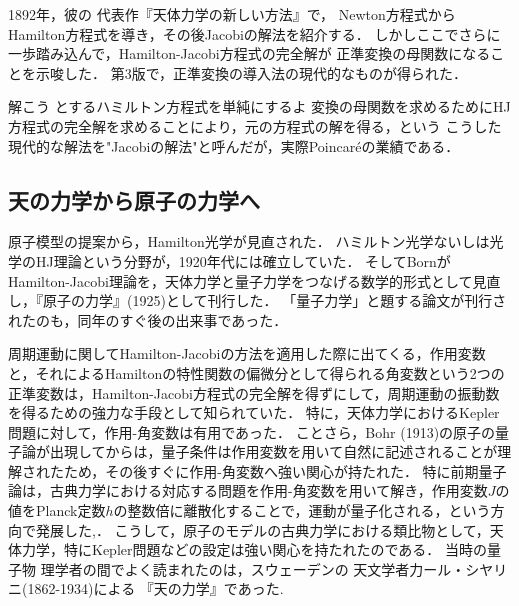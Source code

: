 \documentclass[uplatex,dvipdfmx]{jsreport}
\begin{document}
\begin{history}[Poincaréの本質的貢献]
    1892年，彼の
    代表作『天体力学の新しい方法』で，
    Newton方程式からHamilton方程式を導き，その後Jacobiの解法を紹介する．
    しかしここでさらに一歩踏み込んで，Hamilton-Jacobi方程式の完全解が
    正準変換の母関数になることを示唆した．
    第3版で，正準変換の導入法の現代的なものが得られた．

    解こう
とするハミルトン方程式を単純にするよ
変換の母関数を求めるためにHJ方程式の完全解を求めることにより，元の方程式の解を得る，という
    こうした現代的な解法を"Jacobiの解法"と呼んだが，実際Poincaréの業績である．
\end{history}

\subsection{天の力学から原子の力学へ}

\begin{tcolorbox}[colframe=ForestGreen, colback=ForestGreen!10!white,breakable,colbacktitle=ForestGreen!40!white,coltitle=black,fonttitle=\bfseries\sffamily,
title=]
    原子模型の提案から，Hamilton光学が見直された．
    ハミルトン光学ないしは光学のHJ理論という分野が，1920年代には確立していた．
    そしてBornがHamilton-Jacobi理論を，天体力学と量子力学をつなげる数学的形式として見直し，『原子の力学』(1925)として刊行した．
    「量子力学」と題する論文が刊行されたのも，同年のすぐ後の出来事であった．
\end{tcolorbox}

\begin{history}[『天の力学』]
    周期運動に関してHamilton-Jacobiの方法を適用した際に出てくる，作用変数と，それによるHamiltonの特性関数の偏微分として得られる角変数という2つの正準変数は，Hamilton-Jacobi方程式の完全解を得ずにして，周期運動の振動数を得るための強力な手段として知られていた．
    特に，天体力学におけるKepler問題に対して，作用-角変数は有用であった．
    ことさら，Bohr (1913)の原子の量子論が出現してからは，量子条件は作用変数を用いて自然に記述されることが理解されたため，その後すぐに作用-角変数へ強い関心が持たれた．
    特に前期量子論は，古典力学における対応する問題を作用-角変数を用いて解き，作用変数$J$の値をPlanck定数$h$の整数倍に離散化することで，運動が量子化される，という方向で発展した\cite{Goldstein},\cite{Born25}．
    こうして，原子のモデルの古典力学における類比物として，天体力学，特にKepler問題などの設定は強い関心を持たれたのである．
        当時の量子物
    理学者の間でよく読まれたのは，スウェーデンの
    天文学者力ール・シヤリニ(1862-1934)による
    『天の力学』であった.
\end{history}
\end{document}
